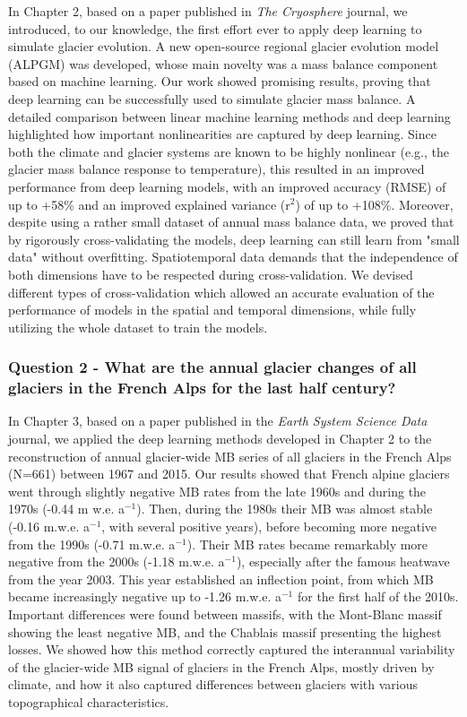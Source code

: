 In Chapter 2, based on a paper published in \textit{The Cryosphere} journal, we introduced, to our knowledge, the first effort ever to apply deep learning to simulate glacier evolution. A new open-source regional glacier evolution model (ALPGM) was developed, whose main novelty was a mass balance component based on machine learning. Our work showed promising results, proving that deep learning can be successfully used to simulate glacier mass balance. A detailed comparison between linear machine learning methods and deep learning highlighted how important nonlinearities are captured by deep learning. Since both the climate and glacier systems are known to be highly nonlinear (e.g., the glacier mass balance response to temperature), this resulted in an improved performance from deep learning models, with an improved accuracy (RMSE) of up to +58\% and an improved explained variance (r$ ^{2}$) of up to +108\%. Moreover, despite using a rather small dataset of annual mass balance data, we proved that by rigorously cross-validating the models, deep learning can still learn from "small data" without overfitting. Spatiotemporal data demands that the independence of both dimensions have to be respected during cross-validation. We devised different types of cross-validation which allowed an accurate evaluation of the performance of models in the spatial and temporal dimensions, while fully utilizing the whole dataset to train the models. 

\subsubsection{Question 2 - What are the annual glacier changes of all glaciers in the French Alps for the last half century?}

In Chapter 3, based on a paper published in the \textit{Earth System Science Data} journal, we applied the deep learning methods developed in Chapter 2 to the reconstruction of annual glacier-wide MB series of all glaciers in the French Alps (N=661) between 1967 and 2015. Our results showed that French alpine glaciers went through slightly negative MB rates from the late 1960s and during the 1970s (-0.44 m w.e. a$^{-1}$). Then, during the 1980s  their MB was almost stable (-0.16 m.w.e. a$^{-1}$, with several positive years), before becoming more negative from the 1990s (-0.71 m.w.e. a$^{-1}$). Their MB rates became remarkably more negative from the 2000s (-1.18 m.w.e. a$^{-1}$), especially after the famous heatwave from the year 2003. This year established an inflection point, from which MB became increasingly negative up to -1.26 m.w.e. a$^{-1}$ for the first half of the 2010s. Important differences were found between massifs, with the Mont-Blanc massif showing the least negative MB, and the Chablais massif presenting the highest losses. We showed how this method correctly captured the interannual variability of the glacier-wide MB signal of glaciers in the French Alps, mostly driven by climate, and how it also captured differences between glaciers with various topographical characteristics. 

